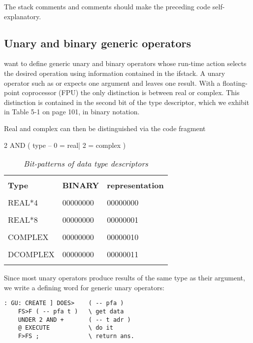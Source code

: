 The stack comments and comments should make the preceding code self-explanatory.

\subsection{Unary and binary generic operators}

 want to define generic unary and binary operators whose run-time action selects the desired operation using information contained in the ifstack. A unary operator such as  or  expects one argument and leaves one result. With a floating-point coprocessor (FPU) the only distinction is between real or complex. This distinction is contained in the second bit of the type descriptor, which we exhibit in Table 5-1 on page 101, in binary notation.

Real and complex can then be distinguished via the code fragment

2 AND ( type -- 0 = real| 2 = complex )

\begin{table}
    \centering
    \caption{\textit{Bit-patterns of data type descriptors}}
        \bigskip
    \label{tbl:09_01} 
    \setlength{\tabcolsep}{30pt}
        \begin{tabular}{|lll|}
            \hline
            & &\\
            \textbf{Type} & \textbf{BINARY} & \textbf{representation} \\
            & &\\
            REAL*4     &  00000000 & 00000000 \\
            & &\\
            REAL*8     &  00000000 & 00000001 \\
            & &\\
            COMPLEX    &  00000000 & 00000010 \\
            & &\\
            DCOMPLEX   &  00000000 & 00000011 \\
            &&\\
            \hline 
        \end{tabular}
\end{table}


Since most unary operators produce results of the same type as their argument, we write a defining word for generic unary operators:

\begin{lstlisting}
: GU: CREATE ] DOES>    ( -- pfa )
    FS>F ( -- pfa t )   \ get data
    UNDER 2 AND +       ( -- t adr )
    @ EXECUTE           \ do it
    F>FS ;              \ return ans.
\end{lstlisting}

